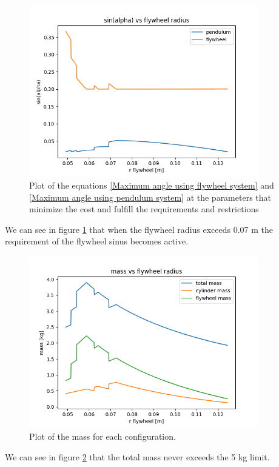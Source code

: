 \begin{figure}[H]
	\centering
	\includegraphics[width=10cm]{img/optimization/sin.png}
	\caption{Plot of the equations \ref{Maximum angle using flywheel system} and \ref{Maximum angle using pendulum system} at the parameters that minimize the cost and fulfill the requirements and restrictions}
	\label{fig:Sinus plot}
\end{figure}

We can see in figure \ref{fig:Sinus plot} that when the flywheel radius 
exceeds 0.07 m the requirement of the flywheel sinus becomes active.



\begin{figure}[H]
	\centering
	\includegraphics[width=10cm]{img/optimization/mass.png}
	\caption{Plot of the mass for each configuration.}
	\label{fig:Mass plot}
\end{figure}

We can see in figure \ref{fig:Mass plot} that the total mass never exceeds the
5 kg limit.


